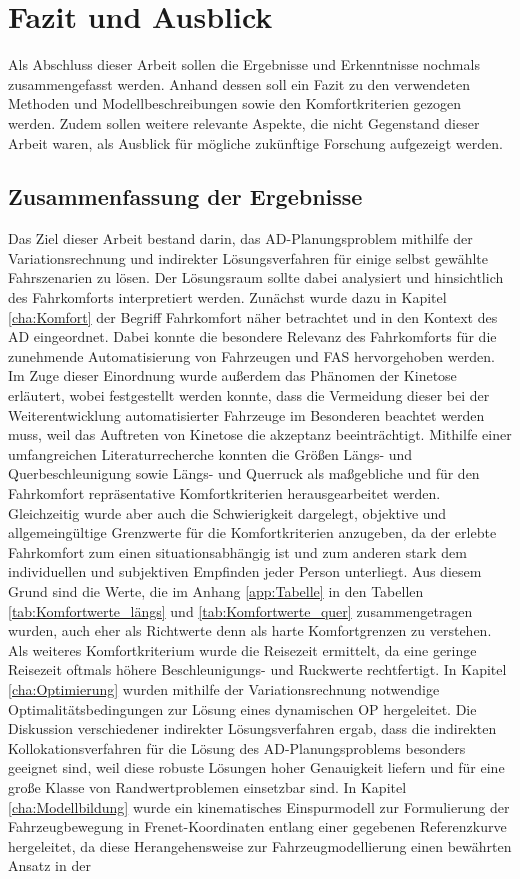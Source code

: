 \chapter{Fazit und Ausblick}\label{cha:Fazit}
Als Abschluss dieser Arbeit sollen die Ergebnisse und Erkenntnisse nochmals zusammengefasst werden. Anhand dessen soll ein Fazit zu den verwendeten Methoden und Modellbeschreibungen sowie den Komfortkriterien gezogen werden. Zudem sollen weitere relevante Aspekte, die nicht Gegenstand dieser Arbeit waren, als Ausblick für mögliche zukünftige Forschung aufgezeigt werden. 

\section{Zusammenfassung der Ergebnisse}
Das Ziel dieser Arbeit bestand darin, das \gls{AD}-Planungsproblem mithilfe der Variationsrechnung und indirekter Lösungsverfahren für einige selbst gewählte Fahrszenarien zu lösen. Der Lösungsraum sollte dabei analysiert und hinsichtlich des Fahrkomforts interpretiert werden. Zunächst wurde dazu in Kapitel \ref{cha:Komfort} der Begriff Fahrkomfort näher betrachtet und in den Kontext des \gls{AD} eingeordnet. Dabei konnte die besondere Relevanz des Fahrkomforts für die zunehmende Automatisierung von Fahrzeugen und \gls{FAS} hervorgehoben werden. Im Zuge dieser Einordnung wurde außerdem das Phänomen der Kinetose erläutert, wobei festgestellt werden konnte, dass die Vermeidung dieser bei der Weiterentwicklung automatisierter Fahrzeuge im Besonderen beachtet werden muss, weil das Auftreten von Kinetose die akzeptanz beeinträchtigt. Mithilfe einer umfangreichen Literaturrecherche konnten die Größen Längs- und Querbeschleunigung sowie Längs- und Querruck als maßgebliche und für den Fahrkomfort repräsentative Komfortkriterien herausgearbeitet werden. Gleichzeitig wurde aber auch die Schwierigkeit dargelegt, objektive und allgemeingültige Grenzwerte für die Komfortkriterien anzugeben, da der erlebte Fahrkomfort zum einen situationsabhängig ist und zum anderen stark dem individuellen und subjektiven Empfinden jeder Person unterliegt. Aus diesem Grund sind die Werte, die im Anhang \ref{app:Tabelle} in den Tabellen \ref{tab:Komfortwerte_längs} und \ref{tab:Komfortwerte_quer} zusammengetragen wurden, auch eher als Richtwerte denn als harte Komfortgrenzen zu verstehen. Als weiteres Komfortkriterium wurde die Reisezeit ermittelt, da eine geringe Reisezeit oftmals höhere Beschleunigungs- und Ruckwerte rechtfertigt. In Kapitel \ref{cha:Optimierung} wurden mithilfe der Variationsrechnung notwendige Optimalitätsbedingungen zur Lösung eines dynamischen \gls{OP} hergeleitet. Die Diskussion verschiedener indirekter Lösungsverfahren ergab, dass die indirekten Kollokationsverfahren für die Lösung des \gls{AD}-Planungsproblems besonders geeignet sind, weil diese robuste Lösungen hoher Genauigkeit liefern und für eine große Klasse von Randwertproblemen einsetzbar sind. In Kapitel \ref{cha:Modellbildung} wurde ein kinematisches Einspurmodell zur Formulierung der Fahrzeugbewegung in Frenet-Koordinaten entlang einer gegebenen Referenzkurve hergeleitet, da diese Herangehensweise zur Fahrzeugmodellierung einen bewährten Ansatz in der 